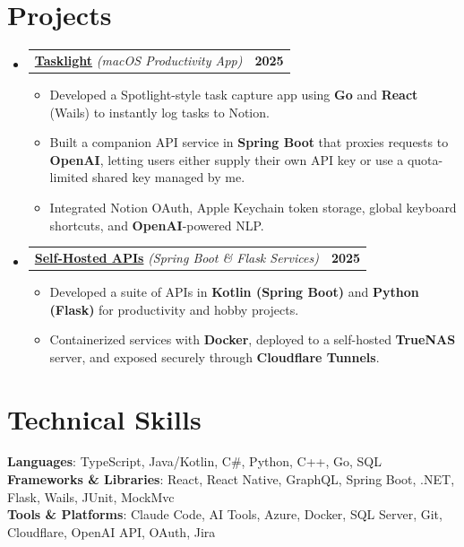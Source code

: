 \documentclass[letterpaper,11pt]{article}
\makeatletter
\newcommand{\resumeItem}[1]{
\item\small{
    {#1 \vspace{-2pt}}
  }
}
\newcommand{\resumeProjectHeading}[2]{
  \vspace{-5pt}
\item
  \begin{tabular*}{1.001\textwidth}{l@{\extracolsep{\fill}}r}
    \small#1 & \textbf{\small #2}\\
  \end{tabular*}\vspace{-20pt}
}
\newcommand{\resumeSubHeadingListStart}{
\begin{itemize}[leftmargin=0.0in, label={}]}
\newcommand{\resumeSubHeadingListEnd}{
\end{itemize}}
\newcommand{\resumeItemListStart}{
\begin{itemize}}
\newcommand{\resumeItemListEnd}{
\end{itemize}\vspace{-5pt}}
\makeatother
\begin{document}
\section{Projects}
\resumeSubHeadingListStart

\resumeProjectHeading
{\textbf{\href{https://github.com/imjamesonzeller/tasklight-v3}{Tasklight}} \emph{(macOS Productivity App)}}{2025}  \resumeItemListStart
\resumeItem{Developed a Spotlight-style task capture app using \textbf{Go} and \textbf{React} (Wails) to instantly log tasks to Notion.}
\resumeItem{Built a companion API service in \textbf{Spring Boot} that proxies requests to \textbf{OpenAI}, letting users either supply their own API key or use a quota-limited shared key managed by me.}
\resumeItem{Integrated Notion OAuth, Apple Keychain token storage, global keyboard shortcuts, and \textbf{OpenAI}-powered NLP.}
\resumeItemListEnd

\resumeProjectHeading
{\textbf{\href{https://github.com/imjamesonzeller/api}{Self-Hosted APIs}} \emph{(Spring Boot \& Flask Services)}}{2025}
\resumeItemListStart
\resumeItem{Developed a suite of APIs in \textbf{Kotlin (Spring Boot)} and \textbf{Python (Flask)} for productivity and hobby projects.}
\resumeItem{Containerized services with \textbf{Docker}, deployed to a self-hosted \textbf{TrueNAS} server, and exposed securely through \textbf{Cloudflare Tunnels}.}
\resumeItemListEnd

\resumeSubHeadingListEnd

\section{Technical Skills}
\begin{itemize}[leftmargin=0.15in, label={}]
    \small{
    \item{
        \textbf{Languages}{: TypeScript, Java/Kotlin, C\#, Python, C++, Go, SQL} \\
        \textbf{Frameworks \& Libraries}{: React, React Native, GraphQL, Spring Boot, .NET, Flask, Wails, JUnit, MockMvc} \\
        \textbf{Tools \& Platforms}{: Claude Code, AI Tools, Azure, Docker, SQL Server, Git, Cloudflare, OpenAI API, OAuth, Jira} \\
    }}
\end{itemize}
\end{document}
